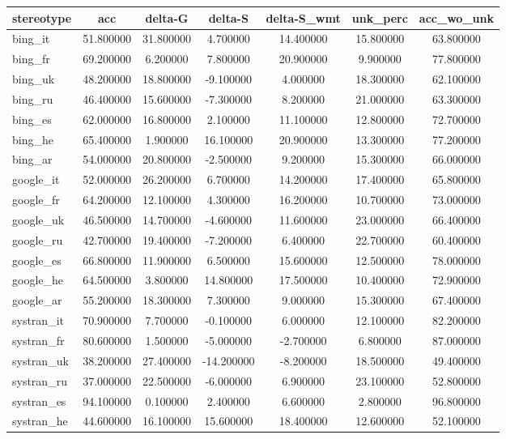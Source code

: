 \begin{tabular}{lcccccc}
\toprule
stereotype & acc & delta-G & delta-S & delta-S_wmt & unk_perc & acc_wo_unk \\
\midrule
bing_it & 51.800000 & 31.800000 & 4.700000 & 14.400000 & 15.800000 & 63.800000 \\
bing_fr & 69.200000 & 6.200000 & 7.800000 & 20.900000 & 9.900000 & 77.800000 \\
bing_uk & 48.200000 & 18.800000 & -9.100000 & 4.000000 & 18.300000 & 62.100000 \\
bing_ru & 46.400000 & 15.600000 & -7.300000 & 8.200000 & 21.000000 & 63.300000 \\
bing_es & 62.000000 & 16.800000 & 2.100000 & 11.100000 & 12.800000 & 72.700000 \\
bing_he & 65.400000 & 1.900000 & 16.100000 & 20.900000 & 13.300000 & 77.200000 \\
bing_ar & 54.000000 & 20.800000 & -2.500000 & 9.200000 & 15.300000 & 66.000000 \\
google_it & 52.000000 & 26.200000 & 6.700000 & 14.200000 & 17.400000 & 65.800000 \\
google_fr & 64.200000 & 12.100000 & 4.300000 & 16.200000 & 10.700000 & 73.000000 \\
google_uk & 46.500000 & 14.700000 & -4.600000 & 11.600000 & 23.000000 & 66.400000 \\
google_ru & 42.700000 & 19.400000 & -7.200000 & 6.400000 & 22.700000 & 60.400000 \\
google_es & 66.800000 & 11.900000 & 6.500000 & 15.600000 & 12.500000 & 78.000000 \\
google_he & 64.500000 & 3.800000 & 14.800000 & 17.500000 & 10.400000 & 72.900000 \\
google_ar & 55.200000 & 18.300000 & 7.300000 & 9.000000 & 15.300000 & 67.400000 \\
systran_it & 70.900000 & 7.700000 & -0.100000 & 6.000000 & 12.100000 & 82.200000 \\
systran_fr & 80.600000 & 1.500000 & -5.000000 & -2.700000 & 6.800000 & 87.000000 \\
systran_uk & 38.200000 & 27.400000 & -14.200000 & -8.200000 & 18.500000 & 49.400000 \\
systran_ru & 37.000000 & 22.500000 & -6.000000 & 6.900000 & 23.100000 & 52.800000 \\
systran_es & 94.100000 & 0.100000 & 2.400000 & 6.600000 & 2.800000 & 96.800000 \\
systran_he & 44.600000 & 16.100000 & 15.600000 & 18.400000 & 12.600000 & 52.100000 \\

\end{tabular}
